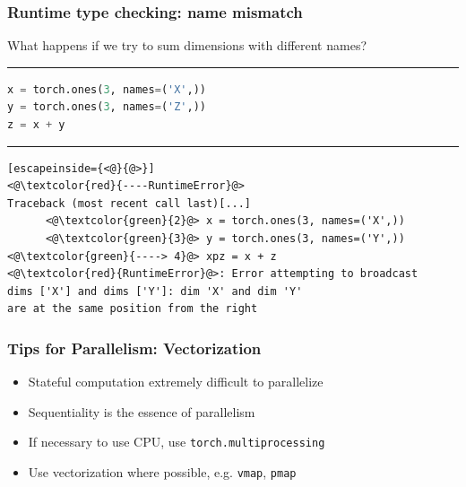 \documentclass{beamer}
\begin{document}
    \begin{frame}[fragile]
        \frametitle{Runtime type checking: name mismatch}

        What happens if we try to sum dimensions with different names?

        \noindent\rule{\textwidth}{0.5pt}

        \begin{lstlisting}[language=Python]
x = torch.ones(3, names=('X',))
y = torch.ones(3, names=('Z',))
z = x + y
        \end{lstlisting}
        \noindent\rule{\textwidth}{0.5pt}
        \begin{lstlisting}[escapeinside={<@}{@>}]
<@\textcolor{red}{----RuntimeError}@>
Traceback (most recent call last)[...]
      <@\textcolor{green}{2}@> x = torch.ones(3, names=('X',))
      <@\textcolor{green}{3}@> y = torch.ones(3, names=('Y',))
<@\textcolor{green}{----> 4}@> xpz = x + z
<@\textcolor{red}{RuntimeError}@>: Error attempting to broadcast
dims ['X'] and dims ['Y']: dim 'X' and dim 'Y'
are at the same position from the right
        \end{lstlisting}
    \end{frame}

    \begin{frame}
        \frametitle{Tips for Parallelism: Vectorization}
        \begin{itemize}
            \item Stateful computation extremely difficult to parallelize
            \item Sequentiality is the essence of parallelism
            \item If necessary to use CPU, use \texttt{torch.multiprocessing}
            \item Use vectorization where possible, e.g. \texttt{vmap}, \texttt{pmap}
        \end{itemize}
    \end{frame}
\end{document}
